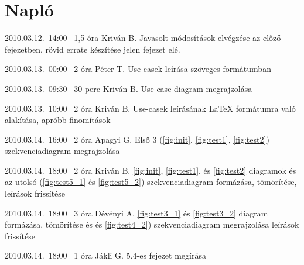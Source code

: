%
\section{Napló}

\begin{naplo}

\bejegyzes
{2010.03.12.~14:00~}
{1,5 óra}
{Kriván B.}
{Javasolt módosítások elvégzése az előző fejezetben, rövid errate készítése jelen fejezet elé.}

\bejegyzes
{2010.03.13.~00:00~}
{2 óra}
{Péter T.}
{Use-casek leírása szöveges formátumban}

\bejegyzes
{2010.03.13.~09:30~}
{30 perc}
{Kriván B.}
{Use-case diagram megrajzolása}

\bejegyzes
{2010.03.13.~10:00~}
{2 óra}
{Kriván B.}
{Use-casek leírásának \LaTeX{} formátumra való alakítása, apróbb finomítások}

\bejegyzes
{2010.03.14.~16:00~}
{2 óra}
{Apagyi G.}
{Első 3 (\ref{fig:init}, \ref{fig:test1}, \ref{fig:test2}) szekvenciadiagram megrajzolása}

\bejegyzes
{2010.03.14.~18:00~}
{2 óra}
{Kriván B.}
{\ref{fig:init}, \ref{fig:test1}, és \ref{fig:test2} diagramok és az utolsó (\ref{fig:test5_1} és \ref{fig:test5_2}) szekvenciadiagram formázása, tömörítése, leírások frissítése}

\bejegyzes
{2010.03.14.~18:00~}
{3 óra}
{Dévényi A.}
{\ref{fig:test3_1} és \ref{fig:test3_2} diagram formázása, tömörítése és  és \ref{fig:test4_2}) szekvenciadiagram megrajzolása leírások frissítése}

\bejegyzes
{2010.03.14.~18:00~}
{1 óra}
{Jákli G.}
{5.4-es fejezet megírása}

\end{naplo}

